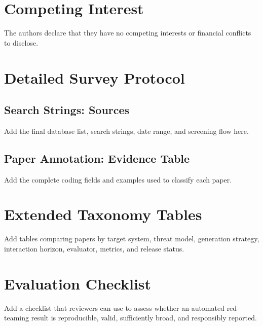\documentclass[review]{fcs}
\begin{document}
\section*{Competing Interest}
The authors declare that they have no competing interests or financial conflicts to disclose.

\appendix

\section{Detailed Survey Protocol}

\subsection{Search Strings: Sources}
Add the final database list, search strings, date range, and screening flow here.

\subsection{Paper Annotation: Evidence Table}
Add the complete coding fields and examples used to classify each paper.

\section{Extended Taxonomy Tables}

Add tables comparing papers by target system, threat model, generation strategy, interaction horizon, evaluator, metrics, and release status.

\section{Evaluation Checklist}

Add a checklist that reviewers can use to assess whether an automated red-teaming result is reproducible, valid, sufficiently broad, and responsibly reported.




\end{document}
